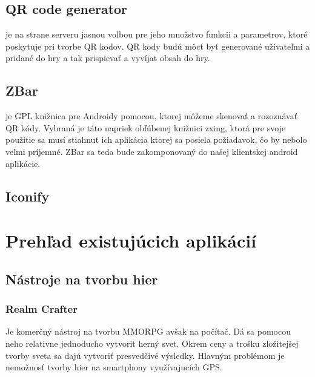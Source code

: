 
\subsection{QR code generator} je na strane serveru jasnou volbou pre jeho množstvo funkcii a parametrov\cite{qrgenerator-functions}, ktoré poskytuje pri tvorbe QR kodov. QR kody budú môcť byť generované užívateľmi a pridané do hry a tak prispievať a vyvíjat obsah do hry.



\subsection{ZBar} je GPL knižnica pre Androidy pomocou, ktorej môžeme skenovať a rozoznávať QR kódy. Vybraná je táto napriek obľúbenej knižnici zxing, ktorá pre svoje použitie sa musí stiahnuť ich aplikácia ktorej sa posiela požiadavok, čo by nebolo veľmi príjemné. ZBar sa teda bude zakomponovaný do našej klientskej android aplikácie\cite{qrreader}.

\subsection{Iconify}


\section{Prehľad existujúcich aplikácií}

\subsection{Nástroje na tvorbu hier}

\subsubsection{Realm Crafter} Je komerčný nástroj na tvorbu MMORPG avšak na počítač. Dá sa pomocou neho relativne jednoducho vytvorit herný svet. Okrem ceny a trošku zložitejšej tvorby sveta sa dajú vytvoriť presvedčivé výsledky. Hlavným problémom je nemožnosť tvorby hier na smartphony využívajucích GPS.

